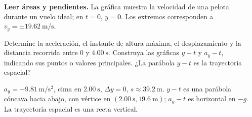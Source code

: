 \begin{ejercicio}
\textbf{Leer áreas y pendientes.} La gráfica muestra la velocidad de una pelota durante un vuelo ideal; en \(t=0\), \(y=0\). Los extremos corresponden a \(v_y=\pm\SI{19.62}{\meter\per\second}\).
\begin{center}
\end{center}
Determine la aceleración, el instante de altura máxima, el desplazamiento y la distancia recorrida entre \(0\) y \(\SI{4.00}{\second}\). Construya las gráficas \(y-t\) y \(a_y-t\), indicando sus puntos o valores principales. ¿La parábola \(y-t\) es la trayectoria espacial?
\end{ejercicio}
\begin{respuesta}
\(a_y=-\SI{9.81}{\meter\per\second\squared}\), cima en \(\SI{2.00}{\second}\), \(\Delta y=0\), \(s\approx\SI{39.2}{\meter}\). \(y-t\) es una parábola cóncava hacia abajo, con vértice en \((\SI{2.00}{\second},\SI{19.6}{\meter})\); \(a_y-t\) es horizontal en \(-g\). La trayectoria espacial es una recta vertical.
\end{respuesta}
